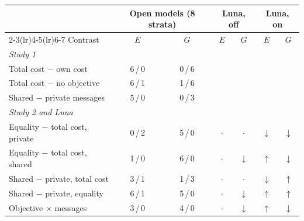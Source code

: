 \begin{tabular}{lcccccc}
\toprule
 & \multicolumn{2}{c}{Open models (8 strata)} & \multicolumn{2}{c}{Luna, off} & \multicolumn{2}{c}{Luna, on} \\
\cmidrule(lr){2-3}\cmidrule(lr){4-5}\cmidrule(lr){6-7}
Contrast & $E$ & $G$ & $E$ & $G$ & $E$ & $G$ \\
\midrule
\multicolumn{7}{l}{\textit{Study 1}} \\
Total cost $-$ own cost & 6\,/\,0 & 0\,/\,6 & & & & \\
Total cost $-$ no objective & 6\,/\,1 & 1\,/\,6 & & & & \\
Shared $-$ private messages & 5\,/\,0 & 0\,/\,3 & & & & \\
\midrule
\multicolumn{7}{l}{\textit{Study 2 and Luna}} \\
Equality $-$ total cost, private & 0\,/\,2 & 5\,/\,0 & $\cdot$ & $\cdot$ & $\downarrow$ & $\downarrow$ \\
Equality $-$ total cost, shared & 1\,/\,0 & 6\,/\,0 & $\cdot$ & $\downarrow$ & $\uparrow$ & $\downarrow$ \\
Shared $-$ private, total cost & 3\,/\,1 & 1\,/\,3 & $\cdot$ & $\cdot$ & $\downarrow$ & $\uparrow$ \\
Shared $-$ private, equality & 6\,/\,1 & 5\,/\,0 & $\cdot$ & $\downarrow$ & $\uparrow$ & $\uparrow$ \\
Objective $\times$ messages & 3\,/\,0 & 4\,/\,0 & $\cdot$ & $\downarrow$ & $\uparrow$ & $\downarrow$ \\
\bottomrule
\end{tabular}
